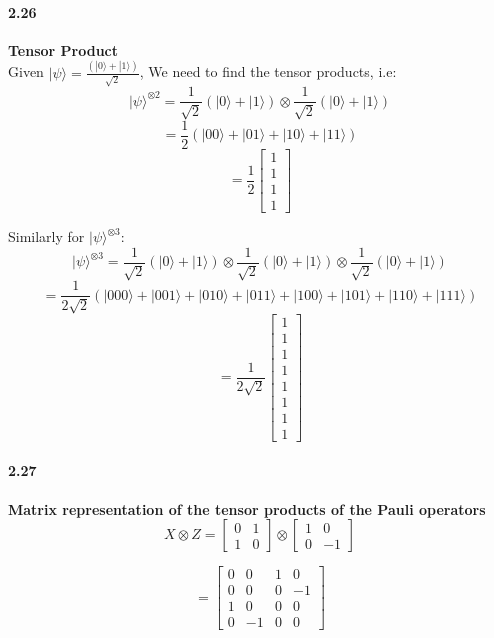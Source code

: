 \paragraph{2.26} \textbf{Tensor Product}%
\\

Given $|\psi\rangle  = \frac{(|0\rangle + |1\rangle)}{\sqrt{2}}$, 
We need to find the tensor products, i.e:
$$|\psi\rangle^{\otimes 2} = \frac{1}{\sqrt{2}} (|0\rangle + |1\rangle) \otimes \frac{1}{\sqrt{2}} (|0\rangle + |1\rangle)  $$
$$ = \frac{1}{2}(|00\rangle + |01\rangle + |10\rangle + |11\rangle)$$
$$ = \frac{1}{2} \begin{bmatrix} 1 \\ 1 \\ 1 \\ 1 \end{bmatrix}$$

Similarly for $|\psi\rangle^{\otimes 3}$:
$$|\psi\rangle^{\otimes 3} = \frac{1}{\sqrt{2}} (|0\rangle + |1\rangle) \otimes \frac{1}{\sqrt{2}} (|0\rangle + |1\rangle) \otimes \frac{1}{\sqrt{2}} (|0\rangle + |1\rangle) $$
$$ = \frac{1}{2\sqrt{2}}(|000\rangle + |001\rangle + |010\rangle + |011\rangle + |100\rangle + |101\rangle + |110\rangle + |111\rangle)$$
$$ = \frac{1}{2\sqrt{2}} \begin{bmatrix} 1 \\ 1 \\ 1 \\ 1 \\ 1 \\ 1\\ 1\\ 1 \end{bmatrix}$$

\paragraph{2.27} \textbf{Matrix representation of the tensor products of the Pauli
operators }%
\\

$$ X \otimes Z  = \begin{bmatrix}
    0 & 1 \\ 1 & 0
\end{bmatrix} \otimes \begin{bmatrix}
    1 & 0 \\ 0 & -1
\end{bmatrix}$$

$$ = \begin{bmatrix}
    0 & 0 & 1 & 0 \\
    0 & 0 & 0 & -1 \\
    1 & 0 & 0 & 0 \\
    0 & -1 & 0 & 0
\end{bmatrix}$$

